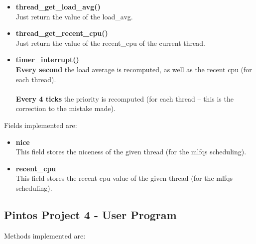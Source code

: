 \documentclass{article}
\begin{document}
\begin{itemize}
	\item \textbf{thread\_get\_load\_avg()}
	\vspace{.2cm} \\
	Just return the value of the load\_avg.
	
	\item \textbf{thread\_get\_recent\_cpu()}
	\vspace{.2cm} \\
	Just return the value of the recent\_cpu of the current thread.
	
	\item \textbf{timer\_interrupt()}
	\vspace{.2cm} \\
	\textbf{Every second} the load average is recomputed, as well as the recent cpu (for each thread). \\ \\
	\textbf{Every 4 ticks} the priority is recomputed (for each thread -- this is the correction to the mistake made).
\end{itemize}
Fields implemented are:

\begin{itemize}
	\item \textbf{nice}
	\vspace{.2cm} \\
	This field stores the niceness of the given thread (for the mlfqs scheduling).
	
	\item \textbf{recent\_cpu}
	\vspace{.2cm} \\
	This field stores the recent cpu value of the given thread (for the mlfqs scheduling).
\end{itemize}

\newpage

\subsection{Pintos Project 4 - User Program}

Methods implemented are:
\end{document}
